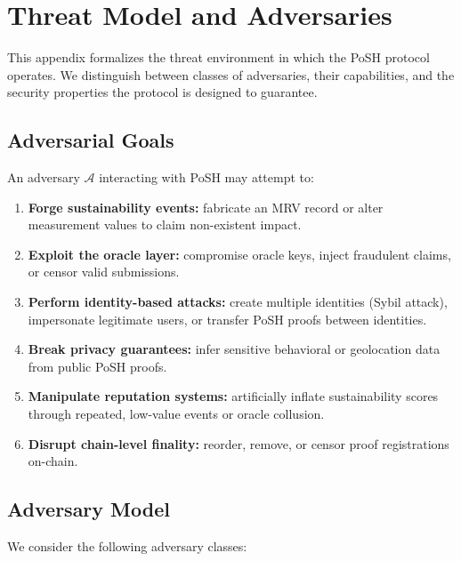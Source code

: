 \documentclass[11pt,a4paper]{report}
\theoremstyle{definition}
\theoremstyle{remark}
\begin{document}

\appendix
\chapter{Threat Model and Adversaries}
\label{appendix:threat-model}

This appendix formalizes the threat environment in which the PoSH protocol
operates. We distinguish between classes of adversaries, their capabilities,
and the security properties the protocol is designed to guarantee.

\section{Adversarial Goals}

An adversary $\mathcal{A}$ interacting with PoSH may attempt to:

\begin{enumerate}[label=\arabic*.,leftmargin=*]
  \item \textbf{Forge sustainability events:} fabricate an MRV record or alter
        measurement values to claim non-existent impact.
  \item \textbf{Exploit the oracle layer:} compromise oracle keys, inject
        fraudulent claims, or censor valid submissions.
  \item \textbf{Perform identity-based attacks:} create multiple identities
        (Sybil attack), impersonate legitimate users, or transfer PoSH proofs
        between identities.
  \item \textbf{Break privacy guarantees:} infer sensitive behavioral or
        geolocation data from public PoSH proofs.
  \item \textbf{Manipulate reputation systems:} artificially inflate sustainability
        scores through repeated, low-value events or oracle collusion.
  \item \textbf{Disrupt chain-level finality:} reorder, remove, or censor proof
        registrations on-chain.
\end{enumerate}

\section{Adversary Model}

We consider the following adversary classes:
\end{document}
